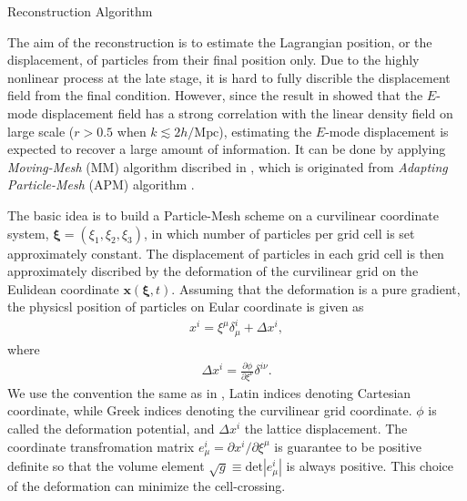 \begin{section}{Reconstruction Algorithm}
  \label{sec:reconstruction}
  
  The aim of the reconstruction is to estimate the Lagrangian
  position, or the displacement, of particles from their final
  position only.  Due to the highly nonlinear process at the late
  stage, it is hard to fully discrible the displacement field from the
  final condition.  However, since the result in \cite{bib:Yu2016}
  showed that the $E$-mode displacement field has a strong correlation
  with the linear density field on large scale ($r > 0.5$ when
  $k \lesssim 2 h/\mathrm{Mpc}$), estimating the $E$-mode displacement
  is expected to recover a large amount of information.  It can be
  done by applying \textit{Moving-Mesh} (MM) algorithm discribed in
  \cite{bib:ZhuH2016}, which is originated from \textit{Adapting
    Particle-Mesh} (APM) algorithm \cite{bib:Pen1995,bib:Pen1998}.

  The basic idea is to build a Particle-Mesh scheme on a curvilinear
  coordinate system, $\bm{\xi}=\left(\xi_1,\xi_2,\xi_3\right)$, in
  which number of particles per grid cell is set approximately
  constant.  The displacement of particles in each grid cell is then
  approximately discribed by the deformation of the curvilinear grid
  on the Eulidean coordinate $\bm{x}(\bm{\xi},t)$.  Assuming that the
  deformation is a pure gradient, the physicsl position of particles
  on Eular coordinate is given as
  \begin{align}
    x^i=\xi ^\mu \delta ^i _\mu + \Delta x^i,
  \end{align}
  where
  \begin{align}
    \label{eq:disp}
    \Delta x^i=\frac{\partial \phi}{\partial \xi ^ \nu}\delta ^{i \nu} .
  \end{align}
  We use the convention the same as in \cite{bib:Pen1995}, Latin
  indices denoting Cartesian coordinate, while Greek indices denoting
  the curvilinear grid coordinate.  $\phi$ is called the deformation
  potential, and $\Delta x^i$ the lattice displacement.  The
  coordinate transfromation matrix
  $e^i_\mu = \partial x^i / \partial \xi ^ \mu$ is guarantee to be
  positive definite so that the volume element
  $\sqrt{g} \equiv \mathrm{det}\left| e^i_\mu\right|$ is always
  positive.  This choice of the deformation can minimize the
  cell-crossing.


\end{section}
